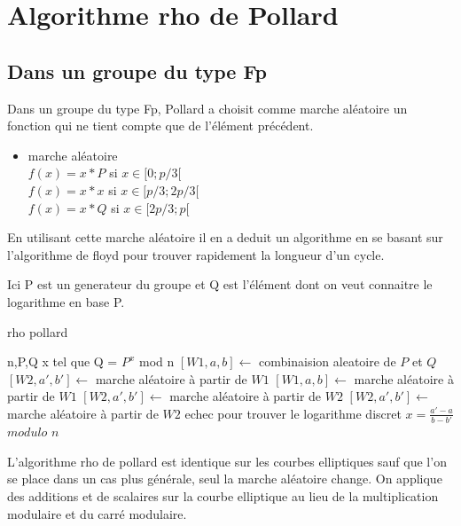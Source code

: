 \documentclass[a4paper,10pt]{report}
\begin{document}
\section{Algorithme rho de Pollard}

\subsection{Dans un groupe du type Fp}

Dans un groupe du type Fp, Pollard a choisit comme marche aléatoire un fonction qui ne tient compte que de l'élément précédent.\\

\begin{itemize}
\item{marche aléatoire}\\
{
$ f(x) = x*P$ si $x \in [0;p/3[$\\
$ f(x) = x*x$ si $x \in [p/3;2p/3[$\\
$ f(x) = x*Q$ si $x \in [2p/3;p[$\\
}
\end{itemize}

En utilisant cette marche aléatoire il en a deduit un algorithme en se basant sur l'algorithme de floyd pour trouver rapidement la longueur d'un cycle.

Ici P est un generateur du groupe et Q est l'élément dont on veut connaitre le logarithme en base P.

{
 \begin{algorithm}
 \caption{rho pollard}
 \begin{algorithmic}
  \REQUIRE n,P,Q
  \ENSURE x tel que Q = $P^x$ mod n
    \STATE $[W1,a,b] \leftarrow$ combinaision aleatoire de $P$ et $Q$
    \STATE $[W2,a',b'] \leftarrow$  marche aléatoire à partir de $W1$
      \STATE $[W1,a,b] \leftarrow$ marche aléatoire à partir de $W1$
      \STATE $[W2,a',b'] \leftarrow$ marche aléatoire à partir de $W2$
      \STATE $[W2,a',b'] \leftarrow$ marche aléatoire à partir de $W2$
    \ENDWHILE
    \STATE echec pour trouver le logarithme discret
  \ELSE
    \STATE $ x = \frac{a'-a}{b-b'}$ $modulo$ $n$
  \ENDIF
 
 \end{algorithmic}
 \end{algorithm}
 }


L'algorithme rho de pollard est identique sur les courbes elliptiques sauf que l'on se place dans un cas plus générale,
seul la marche aléatoire change. On applique des additions et de scalaires sur la courbe elliptique au lieu de la multiplication modulaire et du carré modulaire.
\end{document}
